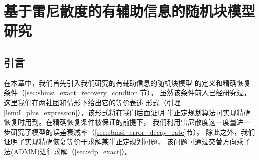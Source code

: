 \chapter{基于雷尼散度的有辅助信息的随机块模型研究}
\label{chap:sbmsi}
\section{引言}
在本章中，我们首先引入我们研究的有辅助信息的随机块模型
的定义和精确恢复条件（\ref{sec:sbmsi_exact_recovery_condtion}节）。
虽然该条件前人已经研究过，这里我们在两社团和情形下给出它的等价表述
形式（引理\ref{lem:I_plus_expression}），该形式将在我们后面证明
半正定规划算法可实现精确恢复时用到。在精确恢复条件被保证的前提下，
我们利用雷尼散度这一度量进一步研究了模型的误差衰减率（\ref{sec:sbmsi_error_decay_rate}节）。
除此之外，我们证明了实现精确恢复等价于求解某半正定规划问题，
该问题可通过交替方向乘子法(ADMM)进行求解（\ref{sec:sdp_exact}）。


